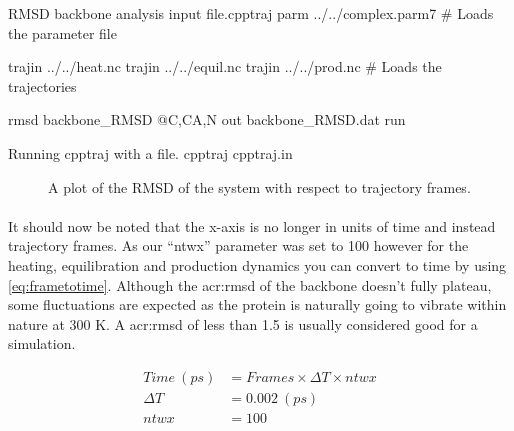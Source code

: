     \begin{inpfile}[label=file:rmsd]{RMSD backbone analysis input file.}{cpptraj}
    parm ../../complex.parm7
    # Loads the parameter file
    
    trajin ../../heat.nc
    trajin ../../equil.nc
    trajin ../../prod.nc
    # Loads the trajectories


    rmsd backbone_RMSD @C,CA,N out backbone_RMSD.dat 
    run
    \end{inpfile}

    \begin{bashcmd}[label=cmd:cpptraj]{Running cpptraj with a file.}
        cpptraj cpptraj.in
    \end{bashcmd}

    \begin{figure}[H]
        \centering
        \caption{A plot of the RMSD of the system with respect to trajectory frames.}
        \label{fig:RMSD}
    \end{figure}

    \paragraph{}
        It should now be noted that the x-axis is no longer in units of time and instead trajectory frames. As our \enquote{ntwx} parameter was set to 100 however for the heating, equilibration and production dynamics you can convert to time by using \cref{eq:frametotime}. Although the \gls{acr:rmsd} of the backbone doesn't fully plateau, some fluctuations are expected as the protein is naturally going to vibrate within nature at 300 K. A \gls{acr:rmsd} of less than 1.5 is usually considered good for a simulation.

    \begin{equation}
        \begin{split}
        Time ~(ps) &= Frames \times \Delta T \times ntwx \\
        \Delta T &= 0.002 ~(ps)             \\
        ntwx &= 100                      \\      
        \end{split}
        \label{eq:frametotime}
    \end{equation}

